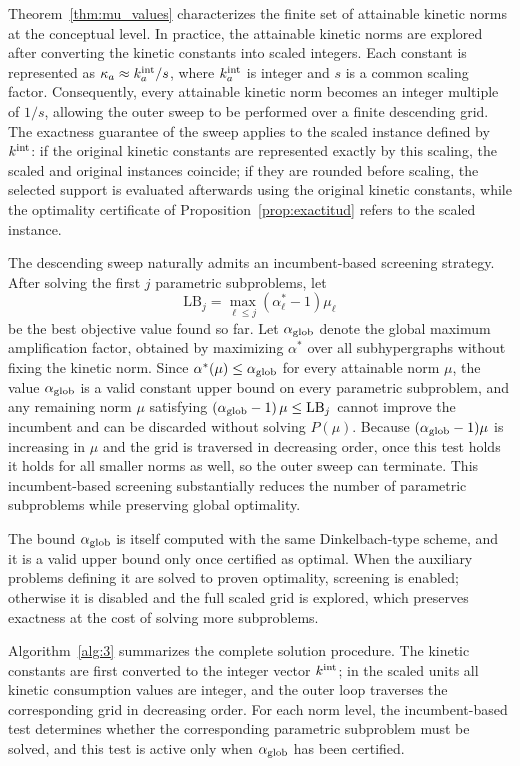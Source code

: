 \documentclass[a4paper,11pt,reqno]{amsart}
\begin{document}
Theorem~\ref{thm:mu_values} characterizes the finite set of attainable
kinetic norms at the conceptual level. In practice, the attainable kinetic norms are explored after converting the
kinetic constants into scaled integers. Each constant is represented as
$\kappa_a\approx k_a^{\rm int}/s$, where $k_a^{\rm int}$ is integer and $s$ is
a common scaling factor. Consequently, every attainable kinetic norm becomes
an integer multiple of $1/s$, allowing the outer sweep to be performed over a
finite descending grid. The exactness guarantee of the sweep applies to the scaled
instance defined by $k^{\rm int}$: if the original kinetic constants are
represented exactly by this scaling, the scaled and original instances
coincide; if they are rounded before scaling, the selected support is evaluated
afterwards using the original kinetic constants, while the optimality
certificate of Proposition~\ref{prop:exactitud} refers to the scaled instance.

The descending sweep naturally admits an incumbent-based screening strategy. After solving the first $j$
parametric subproblems, let
$$
  \mathrm{LB}_j=\max_{\ell\le j}(\alpha_\ell^*-1)\mu_\ell
$$
be the best objective value found so far. Let $\alpha_{\rm glob}$ denote the
global maximum amplification factor, obtained by maximizing $\alpha^*$ over all
subhypergraphs without fixing the kinetic norm. Since $\alpha^*(\mu)\le
\alpha_{\rm glob}$ for every attainable norm $\mu$, the value $\alpha_{\rm
glob}$ is a valid constant upper bound on every parametric subproblem, and any
remaining norm $\mu$ satisfying $(\alpha_{\rm glob}-1)\,\mu\le\mathrm{LB}_j$ 
cannot improve the incumbent and can be discarded without solving $P(\mu)$.
Because $(\alpha_{\rm glob}-1)\mu$ is increasing in $\mu$ and the grid is
traversed in decreasing order, once this test holds it holds for all smaller
norms as well, so the outer sweep can terminate. This incumbent-based screening
substantially reduces the number of parametric subproblems while preserving
global optimality.

The bound $\alpha_{\rm glob}$ is itself computed with the same
Dinkelbach-type scheme, and it is a valid upper bound only once certified as
optimal. When the auxiliary problems defining it are solved to proven
optimality, screening is enabled; otherwise it is disabled and the full scaled
grid is explored, which preserves exactness at the cost of solving more
subproblems.

Algorithm~\ref{alg:3} summarizes the complete solution procedure. The kinetic constants are first converted to the integer vector
$k^{\rm int}$; in the scaled units all kinetic consumption values are integer,
and the outer loop traverses the corresponding grid in decreasing order. For
each norm level, the incumbent-based test determines whether the corresponding
parametric subproblem must be solved, and this test is active only when
$\alpha_{\rm glob}$ has been certified.
\end{document}
